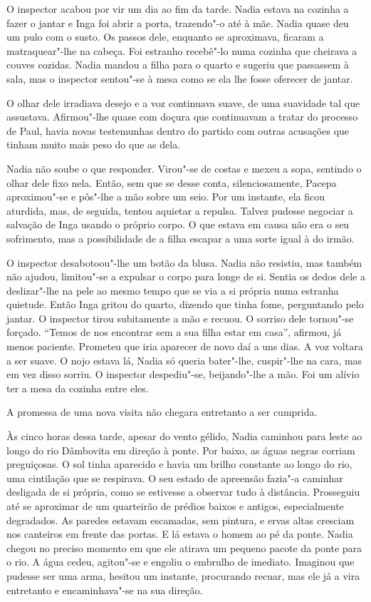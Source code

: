 \bigskip

O inspector acabou por vir um dia ao fim da tarde. Nadia estava na
cozinha a fazer o jantar e Inga foi abrir a porta, trazendo"-o até à mãe.
Nadia quase deu um pulo com o susto. Os passos dele, enquanto se
aproximava, ficaram a matraquear"-lhe na cabeça. Foi estranho recebê"-lo numa cozinha que cheirava a couves cozidas. Nadia mandou a filha
para o quarto e sugeriu que passassem à sala, mas o inspector sentou"-se
à mesa como se ela lhe fosse oferecer de jantar.

O olhar dele irradiava desejo e a voz continuava suave, de uma suavidade
tal que assustava. Afirmou"-lhe quase com doçura que continuavam a tratar
do processo de Paul, havia novas testemunhas dentro do partido com
outras acusações que tinham muito mais peso do que as dela.

Nadia não soube o que responder. Virou"-se de costas e mexeu a sopa,
sentindo o olhar dele fixo nela. Então, sem que se desse conta,
silenciosamente, Pacepa aproximou"-se e pôs"-lhe a mão sobre um seio. Por
um instante, ela ficou
aturdida, mas, de seguida, tentou aquietar a repulsa. Talvez pudesse
negociar a salvação de Inga usando o próprio corpo. O que estava em
causa não era o seu sofrimento, mas a possibilidade de a filha escapar a
uma sorte igual à do irmão.

O inspector desabotoou"-lhe um botão da blusa. Nadia não resistiu, mas
também não ajudou, limitou"-se a expulsar o corpo para longe de si.
Sentia os dedos dele a deslizar"-lhe na pele ao mesmo tempo que se via a si própria numa estranha
quietude. Então Inga gritou do quarto, dizendo que tinha fome,
perguntando pelo jantar. O inspector tirou subitamente a mão e recuou. O
sorriso dele tornou"-se forçado. ``Temos de nos encontrar sem a sua
filha estar em casa'', afirmou, já menos paciente. Prometeu que iria
aparecer de novo daí a uns dias. A voz voltara a ser suave. O nojo
estava lá, Nadia só queria bater"-lhe, cuspir"-lhe na cara, mas em vez
disso sorriu. O inspector despediu"-se, beijando"-lhe a mão. Foi um alívio
ter a mesa da cozinha entre eles.

A promessa de uma nova visita não chegara entretanto a ser cumprida.

\bigskip

Às cinco horas dessa tarde, apesar do vento gélido, Nadia caminhou para
leste ao longo do rio Dâmbovita em direção à ponte. Por baixo, as águas
negras corriam preguiçosas. O sol tinha aparecido e havia um brilho
constante ao longo do rio, uma cintilação que se respirava. O seu
estado de apreensão fazia"-a caminhar desligada de si própria, como se
estivesse a observar tudo à distância. Prosseguiu até se aproximar de um
quarteirão de prédios
baixos e antigos, especialmente degradados. As paredes estavam
escamadas, sem pintura, e ervas altas cresciam nos canteiros em frente
das portas. E lá estava o homem ao pé da ponte. Nadia chegou no preciso
momento em que ele atirava um pequeno pacote da ponte para o rio. A água
cedeu, agitou"-se e engoliu o embrulho de imediato. Imaginou que
pudesse ser uma arma, hesitou um instante, procurando recuar, mas ele
já a vira entretanto e encaminhava"-se na sua direção.


